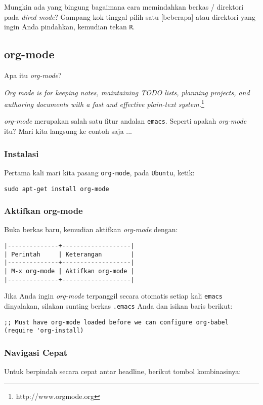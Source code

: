 \documentclass{article}
\begin{document}
Mungkin ada yang bingung bagaimana cara memindahkan berkas / direktori
pada \emph{dired-mode}? Gampang kok tinggal pilih satu [beberapa] atau 
direktori yang ingin Anda pindahkan, kemudian tekan \verb=R=.

\subsection{org-mode}
Apa itu \emph{org-mode}? 

\emph{Org mode is for keeping notes, maintaining TODO lists, planning projects, and authoring documents with a fast and effective plain-text system.}\footnote{http://www.orgmode.org}

\emph{org-mode} merupakan salah satu fitur andalan \verb=emacs=. Seperti apakah
\emph{org-mode} itu? Mari kita langsung ke contoh saja ...

\subsubsection{Instalasi}

Pertama kali mari kita pasang \verb=org-mode=, pada \verb=Ubuntu=, ketik:

\begin{verbatim}
sudo apt-get install org-mode
\end{verbatim}

\subsubsection{Aktifkan org-mode}

Buka berkas baru, kemudian aktifkan \emph{org-mode} dengan:

\begin{verbatim}
|--------------+-------------------|
| Perintah     | Keterangan        |
|--------------+-------------------|
| M-x org-mode | Aktifkan org-mode |
|--------------+-------------------|
\end{verbatim}

Jika Anda ingin \emph{org-mode} terpanggil secara otomatis setiap kali
\verb=emacs= dinyalakan, silakan sunting berkas \verb=.emacs= Anda
dan isikan baris berikut:

\begin{verbatim}
;; Must have org-mode loaded before we can configure org-babel
(require 'org-install)
\end{verbatim}

\subsubsection{Navigasi Cepat}
Untuk berpindah secara cepat antar headline, berikut tombol kombinasinya:
\end{document}
